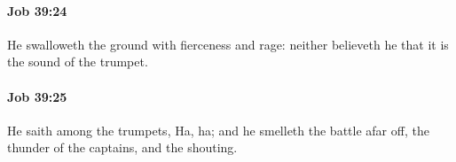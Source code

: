 		\paragraph{Job 39:24} %
			\label{JOB-39-24}

			He swalloweth the ground with fierceness and rage: neither believeth he that it is the sound of the trumpet.


		\paragraph{Job 39:25} %
			\label{JOB-39-25}

			He saith among the trumpets, Ha, ha; and he smelleth the battle afar off, the thunder of the captains, and the shouting.



